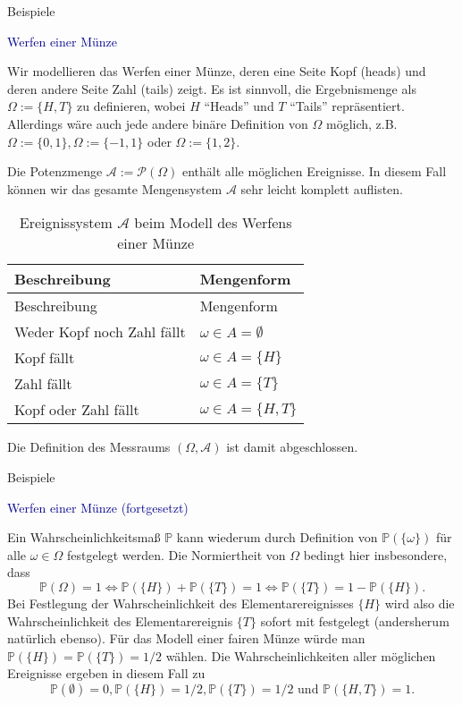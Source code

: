 \documentclass[
  8pt,
  ignorenonframetext,
]{beamer}
\begin{document}
\begin{frame}{Beispiele}
\protect\hypertarget{beispiele-5}{}
\small

\textcolor{darkblue}{Werfen einer Münze} \footnotesize

Wir modellieren das Werfen einer Münze, deren eine Seite Kopf (heads)
und deren andere Seite Zahl (tails) zeigt. Es ist sinnvoll, die
Ergebnismenge als \(\Omega := \{H,T\}\) zu definieren, wobei \(H\)
``Heads'' und \(T\) ``Tails'' repräsentiert. Allerdings wäre auch jede
andere binäre Definition von \(\Omega\) möglich, z.B.
\(\Omega := \{0,1\}, \Omega := \{-1,1\}\) oder \(\Omega := \{1,2\}\).

Die Potenzmenge \(\mathcal{A} := \mathcal{P}(\Omega)\) enthält alle
möglichen Ereignisse. In diesem Fall können wir das gesamte Mengensystem
\(\mathcal{A}\) sehr leicht komplett auflisten.

\begin{longtable}[]{@{}ll@{}}
\caption{Ereignissystem \(\mathcal{A}\) beim Modell des Werfens einer
Münze}\tabularnewline
\toprule()
Beschreibung & Mengenform \\
\midrule()
\endfirsthead
\toprule()
Beschreibung & Mengenform \\
\midrule()
\endhead
Weder Kopf noch Zahl fällt & \(\omega \in A = \emptyset\) \\
Kopf fällt & \(\omega \in A = \{H\}\) \\
Zahl fällt & \(\omega \in A = \{T\}\) \\
Kopf oder Zahl fällt & \(\omega \in A = \{H,T\}\) \\
\bottomrule()
\end{longtable}

Die Definition des Messraums \((\Omega, \mathcal{A})\) ist damit
abgeschlossen.
\end{frame}

\begin{frame}{Beispiele}
\protect\hypertarget{beispiele-6}{}
\small

\textcolor{darkblue}{Werfen einer Münze (fortgesetzt)} \footnotesize

Ein Wahrscheinlichkeitsmaß \(\mathbb{P}\) kann wiederum durch Definition
von \(\mathbb{P}(\{\omega\})\) für alle \(\omega \in \Omega\) festgelegt
werden. Die Normiertheit von \(\Omega\) bedingt hier insbesondere, dass
\begin{equation}
\mathbb{P}(\Omega) = 1
\Leftrightarrow
\mathbb{P}(\{H\}) + \mathbb{P}(\{T\})  = 1
\Leftrightarrow
\mathbb{P}(\{T\}) = 1 - \mathbb{P}(\{H\}).
\end{equation} Bei Festlegung der Wahrscheinlichkeit des
Elementarereignisses \(\{H\}\) wird also die Wahrscheinlichkeit des
Elementarereignis \(\{T\}\) sofort mit festgelegt (andersherum natürlich
ebenso). Für das Modell einer fairen Münze würde man
\(\mathbb{P}(\{H\}) = \mathbb{P}(\{T\}) = 1/2\) wählen. Die
Wahrscheinlichkeiten aller möglichen Ereignisse ergeben in diesem Fall
zu \begin{equation}
\mathbb{P}(\emptyset) = 0,
\mathbb{P}(\{H\}) = 1/2,
\mathbb{P}(\{T\}) = 1/2 \mbox{ und }
\mathbb{P}(\{H,T\}) = 1.
\end{equation}
\end{frame}
\end{document}
